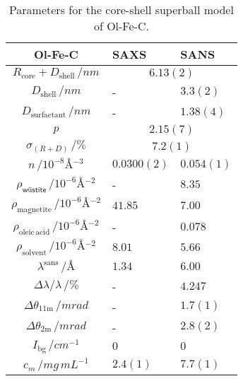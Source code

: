 \documentclass[\main/dresen_thesis.tex]{subfiles}
\begin{document}
  \begin{table}[!htbp]
    \centering
    \caption{\label{tab:colloidalCrystals:nanoparticle:sas}Parameters for the core-shell superball model of Ol-Fe-C.}
    \begin{tabular}{ c | l | l}
      \rule{0pt}{2ex} \textbf{Ol-Fe-C} & \textbf{SAXS} & \textbf{SANS}\\
      \hline
      \rule{0pt}{2ex} $R_\mathrm{core} + D_\mathrm{shell} \, / \unit{nm}$             & \multicolumn{2}{c}{$6.13(2)$} \\
      \rule{0pt}{2ex} $D_\mathrm{shell}\, / \unit{nm}$                                & -            & $3.3(2)$       \\
      \rule{0pt}{2ex} $D_\mathrm{surfactant}\, / \unit{nm}$                           & -            & $1.38(4)$    \\
      \rule{0pt}{2ex} $p $                                                            & \multicolumn{2}{c}{$2.15(7)$} \\
      \rule{0pt}{2ex} $\sigma_{(R+D)}\, / \unit{\%}$                                  & \multicolumn{2}{c}{$7.2(1)$} \\
      \rule{0pt}{2ex} $n \, / \unit{10^{-8} \angstrom^{-3}}$                          & $0.0300(2)$  &  $0.054(1)$ \\
      \hline
      \rule{0pt}{2ex} $\rho_\textsf{w\"ustite} \, / \unit{10^{-6} \angstrom^{-2}}$    & -       & $8.35$\\
      \rule{0pt}{2ex} $\rho_\mathrm{magnetite} \, / \unit{10^{-6} \angstrom^{-2}}$    & $41.85$ & $7.00$\\
      \rule{0pt}{2ex} $\rho_\mathrm{oleic\, acid} \, / \unit{10^{-6} \angstrom^{-2}}$ & -       & $0.078$\\
      \rule{0pt}{2ex} $\rho_\mathrm{solvent} \, / \unit{10^{-6} \angstrom^{-2}}$      & $8.01$  & $5.66$\\
      \hline
      \rule{0pt}{2ex} $\lambda^\mathrm{sans} \, / \unit{\unit{\angstrom}}$            & $1.34$  & $6.00$\\
      \rule{0pt}{2ex} $\Delta \lambda / \lambda \, / \unit{\%}$                       & -       & $4.247$\\
      \rule{0pt}{2ex} $\Delta \theta_\mathrm{11 m} \, / \unit{mrad}$                  & -       & $1.7(1)$\\
      \rule{0pt}{2ex} $\Delta \theta_\mathrm{2 m} \, / \unit{mrad}$                   & -       & $2.8(2)$\\
      \rule{0pt}{2ex} $I_\mathrm{bg} \, / \unit{cm^{-1}}$                             & $0$     & $0$\\
      \hline
      \rule{0pt}{2ex} $c_m \, / \unit{mg\, mL^{-1}}$                                  & $2.4(1)$ & $7.7(1)$\\
      \hline
    \end{tabular}
  \end{table}
\end{document}

